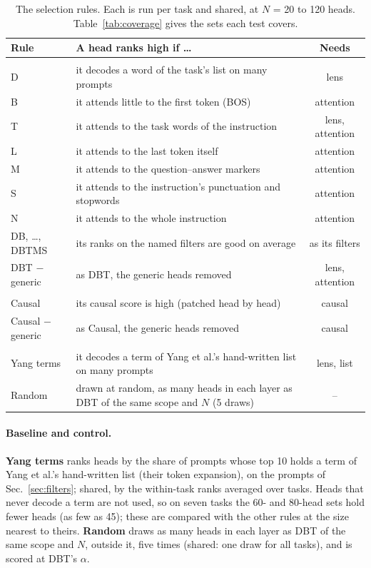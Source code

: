 \documentclass[10pt,a4paper]{article}
\begin{document}
\begin{table}[tbp]
\centering\small
\begin{tabularx}{\textwidth}{@{}>{\raggedright\arraybackslash}p{3.6cm}Lc@{}}
\toprule
Rule & A head ranks high if \dots & Needs \\
\midrule
{} \\
D & it decodes a word of the task's list on many prompts & lens \\
B & it attends little to the first token (BOS) & attention \\
T & it attends to the task words of the instruction & lens, attention \\
L & it attends to the last token itself & attention \\
M & it attends to the question--answer markers & attention \\
S & it attends to the instruction's punctuation and stopwords & attention \\
N & it attends to the whole instruction & attention \\
DB, \dots, DBTMS & its ranks on the named filters are good on average & as its filters \\
DBT $-$ generic & as DBT, the generic heads removed & lens, attention \\
\midrule
{} \\
Causal & its causal score is high (patched head by head) & causal \\
Causal $-$ generic & as Causal, the generic heads removed & causal \\
\midrule
{} \\
Yang terms & it decodes a term of Yang et al.'s hand-written list on many prompts & lens, list \\
Random & drawn at random, as many heads in each layer as DBT of the same scope and $N$ (5 draws) & -- \\
\bottomrule
\end{tabularx}
\caption{The selection rules. Each is run per task and shared, at $N$ = 20 to 120 heads. Table~\ref{tab:coverage} gives the sets each test covers.}
\label{tab:approaches}
\end{table}

\paragraph{Baseline and control.} \textbf{Yang terms} ranks heads by the share of prompts whose top 10 holds a term of Yang et al.'s hand-written list (their token expansion), on the prompts of Sec.~\ref{sec:filters}; shared, by the within-task ranks averaged over tasks. Heads that never decode a term are not used, so on seven tasks the 60- and 80-head sets hold fewer heads (as few as 45); these are compared with the other rules at the size nearest to theirs. \textbf{Random} draws as many heads in each layer as DBT of the same scope and $N$, outside it, five times (shared: one draw for all tasks), and is scored at DBT's $\alpha$.
\end{document}

